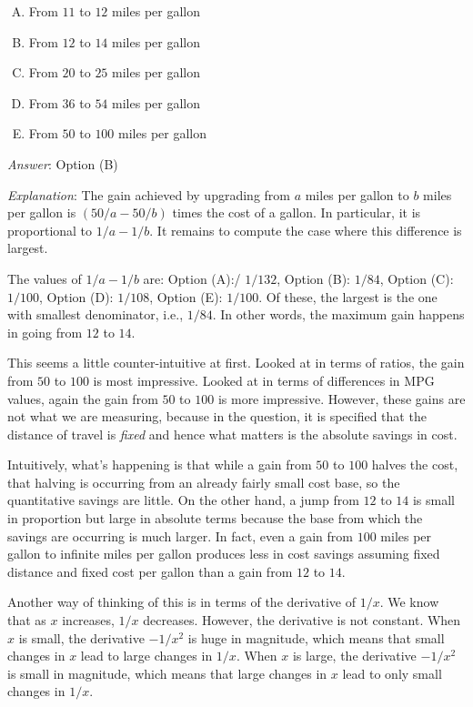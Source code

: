 \documentclass[10pt]{amsart}
\begin{document}
\begin{enumerate}
  \begin{enumerate}[(A)]
  \item From $11$ to $12$ miles per gallon
  \item From $12$ to $14$ miles per gallon
  \item From $20$ to $25$ miles per gallon
  \item From $36$ to $54$ miles per gallon
  \item From $50$ to $100$ miles per gallon
  \end{enumerate}

  {\em Answer}: Option (B)

  {\em Explanation}: The gain achieved by upgrading from $a$ miles per
  gallon to $b$ miles per gallon is $(50/a - 50/b)$ times the cost of
  a gallon. In particular, it is proportional to $1/a - 1/b$. It
  remains to compute the case where this difference is largest.

  The values of $1/a - 1/b$ are: Option (A):/ $1/132$, Option (B):
  $1/84$, Option (C): $1/100$, Option (D): $1/108$, Option (E):
  $1/100$. Of these, the largest is the one with smallest denominator,
  i.e., $1/84$. In other words, the maximum gain happens in going from
  $12$ to $14$.

  This seems a little counter-intuitive at first. Looked at in terms
  of ratios, the gain from $50$ to $100$ is most impressive. Looked at
  in terms of differences in MPG values, again the gain from $50$ to
  $100$ is more impressive. However, these gains are not what we are
  measuring, because in the question, it is specified that the
  distance of travel is {\em fixed} and hence what matters is the
  absolute savings in cost.

  Intuitively, what's happening is that while a gain from $50$ to
  $100$ halves the cost, that halving is occurring from an already
  fairly small cost base, so the quantitative savings are little. On
  the other hand, a jump from $12$ to $14$ is small in proportion but
  large in absolute terms because the base from which the savings are
  occurring is much larger. In fact, even a gain from $100$ miles per
  gallon to infinite miles per gallon produces less in cost savings
  assuming fixed distance and fixed cost per gallon than a gain from
  $12$ to $14$.

  Another way of thinking of this is in terms of the derivative of
  $1/x$. We know that as $x$ increases, $1/x$ decreases. However, the
  derivative is not constant. When $x$ is small, the derivative
  $-1/x^2$ is huge in magnitude, which means that small changes in $x$
  lead to large changes in $1/x$. When $x$ is large, the derivative
  $-1/x^2$ is small in magnitude, which means that large changes in
  $x$ lead to only small changes in $1/x$.


\end{enumerate}
\end{document}
